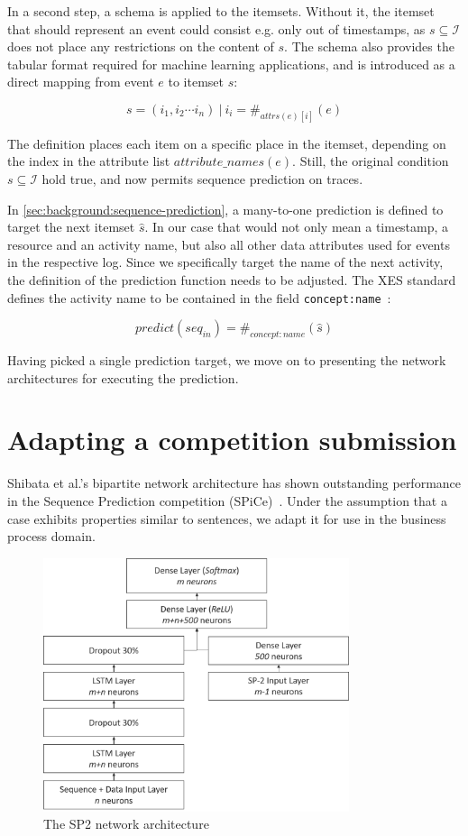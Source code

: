 In a second step, a schema is applied to the itemsets. Without it, the itemset that should represent an event could consist e.g. only out of timestamps, as $s \subseteq \mathscr{I}$ does not place any restrictions on the content of $s$.
The schema also provides the tabular format required for machine learning applications, and is introduced as a direct mapping from event $e$ to itemset $s$:

$$ s = (i_1, i_2 \cdots i_n)\ |\ i_i = \#_{attrs(e)[i]}(e) $$

The definition places each item on a specific place in the itemset, depending on the index in the attribute list $attribute\_names(e)$. Still, the original condition $s \subseteq \mathscr{I}$ hold true, and now permits sequence prediction on traces.

In \autoref{sec:background:sequence-prediction}, a many-to-one prediction is defined to target the next itemset $\hat{s}$.
In our case that would not only mean a timestamp, a resource and an activity name, but also all other data attributes used for events in the respective log. Since we specifically target the name of the next activity, the definition of the prediction function needs to be adjusted. The XES standard defines the activity name to be contained in the field \verb=concept:name=~\cite{Aalst2016}:

$$ predict(seq_{in}) = \#_{concept:name}(\hat{s}) $$

Having picked a single prediction target, we move on to presenting the network architectures for executing the prediction.

\section{Adapting a competition submission}\label{sec:contrib:sp2-inspiration}
Shibata et al.'s bipartite network architecture has shown outstanding performance in the Sequence Prediction competition (SPiCe)~\cite{web:spice}. Under the assumption that a case exhibits properties similar to sentences, we adapt it for use in the business process domain.

\begin{figure}[!htb]
    \centering
    \includegraphics[width=0.8\textwidth]{gfx/sp2-network-architecture.png}
    \caption{The SP2 network architecture}
    \label{fig:sp2-architecture}
\end{figure}

